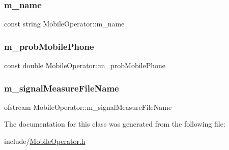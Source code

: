 \subsubsection{\texorpdfstring{m\_name}{m\_name}}
{\footnotesize\ttfamily const string Mobile\+Operator\+::m\+\_\+name\hspace{0.3cm}{\ttfamily [private]}}

\mbox{\label{class_mobile_operator_a4061b50b15ec5499d57ef0e85687c1a2}} 
\subsubsection{\texorpdfstring{m\_probMobilePhone}{m\_probMobilePhone}}
{\footnotesize\ttfamily const double Mobile\+Operator\+::m\+\_\+prob\+Mobile\+Phone\hspace{0.3cm}{\ttfamily [private]}}

\mbox{\label{class_mobile_operator_af9c02c4088656c0f21ecc93b7023e776}} 
\subsubsection{\texorpdfstring{m\_signalMeasureFileName}{m\_signalMeasureFileName}}
{\footnotesize\ttfamily ofstream Mobile\+Operator\+::m\+\_\+signal\+Measure\+File\+Name\hspace{0.3cm}{\ttfamily [private]}}



The documentation for this class was generated from the following file\+:\begin{DoxyCompactItemize}
\item 
include/\mbox{\hyperlink{_mobile_operator_8h}{Mobile\+Operator.\+h}}\end{DoxyCompactItemize}
